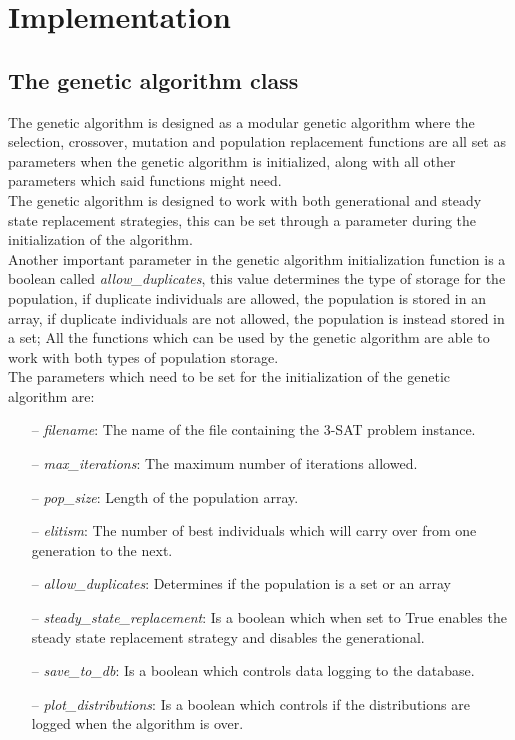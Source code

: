 \section{Implementation}
\label{section:implementation}

\subsection{The genetic algorithm class}
\label{subsection:ga_class}

The genetic algorithm is designed as a modular genetic algorithm where the selection, crossover, mutation and population replacement functions are all set as parameters when the genetic algorithm is initialized, along with all other parameters which said functions might need. 
\\The genetic algorithm is designed to work with both generational and steady state replacement strategies, this can be set through a parameter during the initialization of the algorithm.
\\Another important parameter in the genetic algorithm initialization function is a boolean called \textit{allow\_duplicates}, this value determines the type of storage for the population, if duplicate individuals are allowed, the population is stored in an array, if duplicate individuals are not allowed, the population is instead stored in a set; All the functions which can be used by the genetic algorithm are able to work with both types of population storage.
\\The parameters which need to be set for the initialization of the genetic algorithm are:
\begin{itemize}
\item[--]\textit{filename}: The name of the file containing the 3-SAT problem instance.
\item[--]\textit{max\_iterations}: The maximum number of iterations allowed.
\item[--]\textit{pop\_size}: Length of the population array.
\item[--]\textit{elitism}: The number of best individuals which will carry over from one generation to the next.
\item[--]\textit{allow\_duplicates}: Determines if the population is a set or an array
\item[--]\textit{steady\_state\_replacement}: Is a boolean which when set to True enables the steady state replacement strategy and disables the generational.
\item[--]\textit{save\_to\_db}: Is a boolean which controls data logging to the database.
\item[--]\textit{plot\_distributions}: Is a boolean which controls if the distributions are logged when the algorithm is over. 
\end{itemize}
